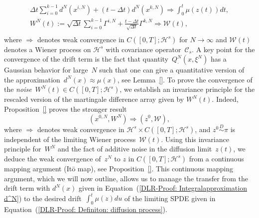 \begin{equation}
  \begin{split}
   \Delta t \sum_{i=0}^{k-1} d^N(x^{i,N}) + (t - \Delta t) d^N(x^{k,N}) \Longrightarrow \int_0^t \mu(z(t)) dt, \\
   W^N(t) := \sqrt{ \Delta t} \sum_{i=0}^{k-1} \Gamma^{i,N} +  \frac{t - \Delta t}{\sqrt{\Delta t}} \Gamma^{k,N} \Longrightarrow \mathcal{W}(t), \\
 \end{split}
\end{equation}
where $\Longrightarrow$ denotes weak convergence in $C([0,T];\mathcal{H}^s)$ for $N \to \infty$ and $\mathcal{W}(t)$ denotes a Wiener process on $\mathcal{H}^s$ with  covariance operator~$\mathcal{C}_s$. A key point for the convergence of the drift term is the fact that quantity~$Q^N_{\cdot}(x, \xi^N)$ has a Gaussian behavior for large~$N$ such that one can give a quantitative version of the approximation~$ d^N(x) \approx \mu(x) $, see Lemma~\ref{}. To prove the convergence of the \textit{noise}~$W^N(t) \in C([0,T];\mathcal{H}^s)$, we establish an invariance principle for the rescaled version of the martingale difference array given by $W^N(t)$. Indeed, Proposition~\ref{} proves the stronger result
\begin{equation*}
  (x^{0,N}, W^N) \Longrightarrow (z^0, \mathcal{W}),
\end{equation*}
where $\Longrightarrow$ denotes weak convergence in $\mathcal{H}^s \times C([0,T];\mathcal{H}^s)$, and $z^0 \stackrel{D}{\sim} \pi$ is independent of the limiting Wiener process~$\mathcal{W}(t)$. Using this invariance principle for~$W^N$ and the fact of additive noise in the diffusion limit~$z(t)$, we deduce the weak convergence of~$z^N$ to $z$ in $ C([0,T];\mathcal{H}^s)$ from a continuous  mapping argument (It\={o} map), see Proposition~\ref{}. This continuous mapping argument, which we will now outline, allows us to manage the transfer from the drift term with $d^N(x)$ given in Equation~(\ref{DLR-Proof: Integralapproximation d^N}) to the desired drift~$ \int_0^t \mu(z) du$ of the limiting SPDE given in Equation~(\ref{DLR-Proof: Definiton: diffusion process}). 

